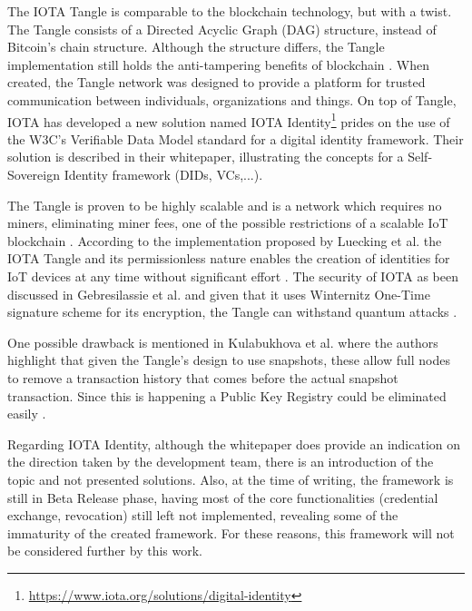 The IOTA Tangle is comparable to the blockchain technology, but with a twist. The Tangle consists of a Directed Acyclic Graph (DAG) structure, instead of Bitcoin's chain structure. Although the structure differs, the Tangle implementation still holds the anti-tampering benefits of blockchain \cite{s18082575} \cite{inbookWang}. When created, the Tangle network was designed to provide a platform for trusted communication between individuals, organizations and things. On top of Tangle, IOTA has developed a new solution named IOTA Identity\footnote{\url{https://www.iota.org/solutions/digital-identity}} prides on the use of the W3C's Verifiable Data Model standard for a digital identity framework. Their solution is described in their whitepaper, illustrating the concepts for a Self-Sovereign Identity framework (DIDs, VCs,...)\cite{IOTAIdentity}.

The Tangle is proven to be highly scalable \cite{luecking2020decentralized} \cite{gebresilassie2020distributed} \cite{s18082575} and is a network which requires no miners, eliminating miner fees, one of the possible restrictions of a scalable IoT blockchain \cite{s18082575} \cite{inbookWang}.
According to the implementation proposed by Luecking et al. the IOTA Tangle and its permissionless nature enables the creation of identities for IoT devices at any time without significant effort \cite{luecking2020decentralized}.
The security of IOTA as been discussed in Gebresilassie et al. and given that it uses Winternitz One-Time signature scheme for its encryption, the Tangle can withstand quantum attacks \cite{gebresilassie2020distributed}.

One possible drawback is mentioned in Kulabukhova et al. where the authors highlight that given the Tangle's design to use snapshots, these allow full nodes to remove a transaction history that comes before the actual snapshot transaction. Since this is happening a Public Key Registry could be eliminated easily \cite{kulabukhova2019self}.

Regarding IOTA Identity, although the whitepaper does provide an indication on the direction taken by the development team, there is an introduction of the topic and not presented solutions. Also, at the time of writing, the framework is still in Beta Release phase, having most of the core functionalities (credential exchange, revocation) still left not implemented, revealing some of the immaturity of the created framework. For these reasons, this framework will not be considered further by this work.

